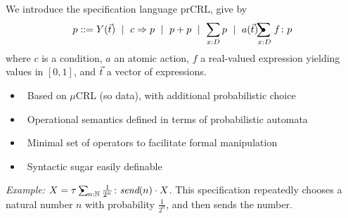 
\begin{block}{\large {}\vphantom{Introduction}}
We introduce the specification language \alert{prCRL}, give by
\begin{align*}\color{black}
     p ::= Y(\dv) \ \mid\  c \Rightarrow p \ \mid \ p + p \ \mid \ \sum_{x:D} p \ \mid \ a(\dv) \!\!\psum_{x :D} f \colon p
\end{align*}
where $c$ is a \alert{condition}, $a$ an atomic \alert{action}, $f$ a \alert{real-valued expression} yielding values in $[0,1]$, and $\vec{t}$ a \alert{vector of expressions}. 

\vskip20pt

\begin{adjustwidth}{0.5cm}{0.5cm}
\begin{itemize}
\item \ Based on $\mu$CRL (so \alert{data}), with additional \alert{probabilistic choice}
\item \ Operational semantics defined in terms of \alert{probabilistic automata}
\item \ Minimal set of operators to \alert{facilitate formal manipulation}
\item \ \alert{Syntactic sugar} easily definable
\end{itemize}
\end{adjustwidth}

\vskip20pt

\textit{Example:} $X = \tau \psum_{n:\mathbb{N}} \frac{1}{2^n}\colon \text{\it send}(n) \cdot X$. This specification repeatedly chooses a natural number $n$ with probability $\frac{1}{2^n}$, and then sends the number.
\end{block}	
